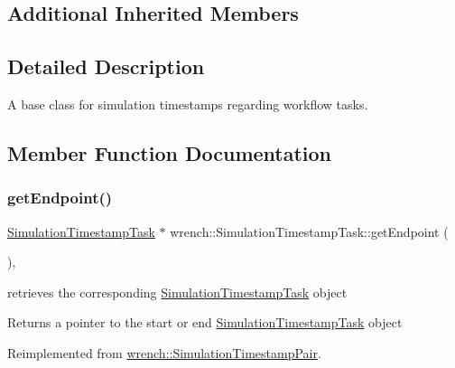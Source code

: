 \subsection*{Additional Inherited Members}


\subsection{Detailed Description}
A base class for simulation timestamps regarding workflow tasks. 

\subsection{Member Function Documentation}
\mbox{\label{classwrench_1_1_simulation_timestamp_task_af8e8da0d1710e20f4e517852c53cb1f2}} 
\subsubsection{\texorpdfstring{get\+Endpoint()}{getEndpoint()}}
{\footnotesize\ttfamily \hyperlink{classwrench_1_1_simulation_timestamp_task}{Simulation\+Timestamp\+Task} $\ast$ wrench\+::\+Simulation\+Timestamp\+Task\+::get\+Endpoint (\begin{DoxyParamCaption}{ }\end{DoxyParamCaption})\hspace{0.3cm}{\ttfamily [override]}, {\ttfamily [virtual]}}



retrieves the corresponding \hyperlink{classwrench_1_1_simulation_timestamp_task}{Simulation\+Timestamp\+Task} object 

\begin{DoxyReturn}{Returns}
a pointer to the start or end \hyperlink{classwrench_1_1_simulation_timestamp_task}{Simulation\+Timestamp\+Task} object 
\end{DoxyReturn}


Reimplemented from \hyperlink{classwrench_1_1_simulation_timestamp_pair_aa47d05297b863c29179a505ea4e5dfdf}{wrench\+::\+Simulation\+Timestamp\+Pair}.

\mbox{\label{classwrench_1_1_simulation_timestamp_task_a9a9440d71940fccf0fb33383ce056a37}} 

